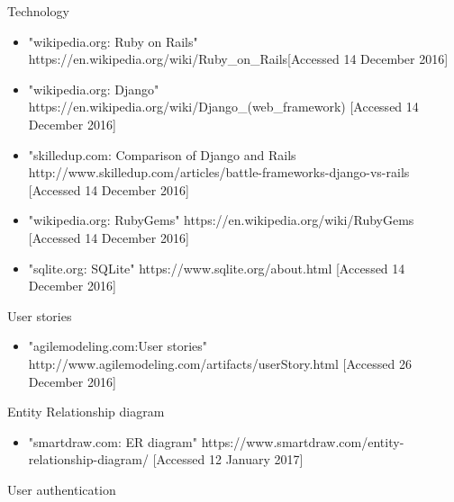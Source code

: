 \documentclass{l3proj}
\begin{document}
\label{tech}
Technology
\begin{itemize}

\item "wikipedia.org: Ruby on Rails"
\newline https://en.wikipedia.org/wiki/Ruby\_on\_Rails[Accessed 14 December 2016]

\item "wikipedia.org: Django"
\newline https://en.wikipedia.org/wiki/Django\_(web\_framework) [Accessed 14 December 2016]

\item "skilledup.com: Comparison of Django and Rails
\newline http://www.skilledup.com/articles/battle-frameworks-django-vs-rails [Accessed 14 December 2016]

\item "wikipedia.org: RubyGems"
\newline https://en.wikipedia.org/wiki/RubyGems [Accessed 14 December 2016]

\item "sqlite.org: SQLite"
\newline https://www.sqlite.org/about.html [Accessed 14 December 2016]


\end{itemize}




\label{user_stories}

User stories

\begin{itemize}

\item "agilemodeling.com:User stories"
\newline http://www.agilemodeling.com/artifacts/userStory.html [Accessed 26 December 2016]

\end{itemize}


\label{er}
Entity Relationship diagram

\begin{itemize}

\item "smartdraw.com: ER diagram"
\newline https://www.smartdraw.com/entity-relationship-diagram/ [Accessed 12 January 2017]

\end{itemize}

\label{authentication}
User authentication
\end{document}
